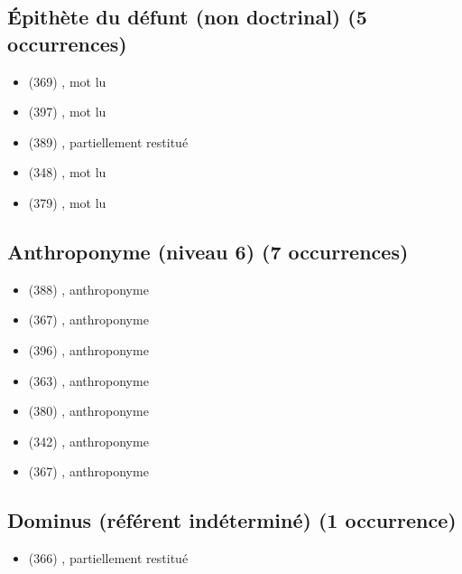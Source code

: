 \subsection*{Épithète du défunt (non doctrinal) (5 occurrences)}
\begin{itemize}[leftmargin=1.2em,itemsep=0pt]
\item {} (369) , mot lu
\item {} (397) , mot lu
\item {} (389) , partiellement restitué
\item {} (348) , mot lu
\item {} (379) , mot lu
\end{itemize}
\subsection*{Anthroponyme (niveau 6) (7 occurrences)}
\begin{itemize}[leftmargin=1.2em,itemsep=0pt]
\item {} (388) , anthroponyme
\item {} (367) , anthroponyme
\item {} (396) , anthroponyme
\item {} (363) , anthroponyme
\item {} (380) , anthroponyme
\item {} (342) , anthroponyme
\item {} (367) , anthroponyme
\end{itemize}
\subsection*{Dominus (référent indéterminé) (1 occurrence)}
\begin{itemize}[leftmargin=1.2em,itemsep=0pt]
\item {} (366) , partiellement restitué
\end{itemize}
